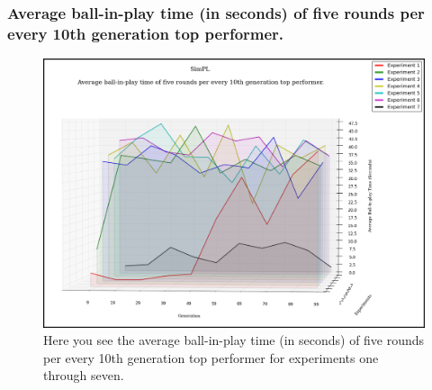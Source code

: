 \documentclass[a4paper,10pt]{article}
\begin{document}
\subsubsection{Average ball-in-play time (in seconds) of five rounds per every 10th generation top performer.}

\begin{figure}[H]  
  \centering
  \includegraphics[width=1\textwidth]{figures/all_10_tops_times.png}
  \caption{Here you see the average ball-in-play time (in seconds) of five rounds per every 10th generation top performer for experiments one through seven.}
  \label{fig:all_10_tops_times}
\end{figure}




\end{document}

